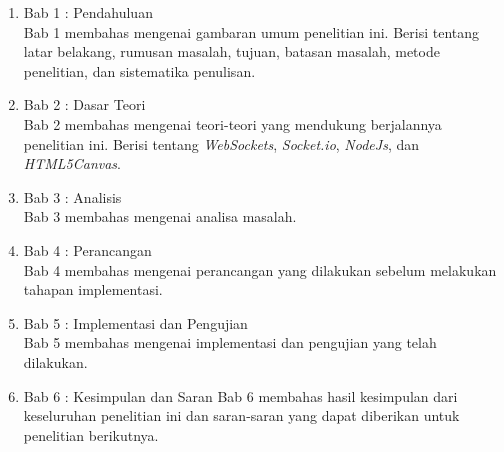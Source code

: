 \begin{enumerate}
	\item Bab 1 : Pendahuluan \\
	Bab 1 membahas mengenai gambaran umum penelitian ini. Berisi tentang latar belakang, rumusan masalah, tujuan, batasan masalah, metode penelitian, dan sistematika penulisan.
	
	\item Bab 2 : Dasar Teori \\
	Bab 2 membahas mengenai teori-teori yang mendukung berjalannya penelitian ini. Berisi tentang \textit{WebSockets}, \textit{Socket.io}, \textit{NodeJs}, dan \textit{HTML5Canvas}.
	
	\item Bab 3 : Analisis \\
	Bab 3 membahas mengenai analisa masalah.
	
	\item Bab 4 : Perancangan \\
	Bab 4 membahas mengenai perancangan yang dilakukan sebelum melakukan tahapan implementasi.
	
	\item Bab 5 : Implementasi dan Pengujian \\
	Bab 5 membahas mengenai implementasi dan pengujian yang telah dilakukan.
	
	\item Bab 6 : Kesimpulan dan Saran
	Bab 6 membahas hasil kesimpulan dari keseluruhan penelitian ini dan saran-saran yang dapat diberikan untuk penelitian berikutnya.
\end{enumerate}